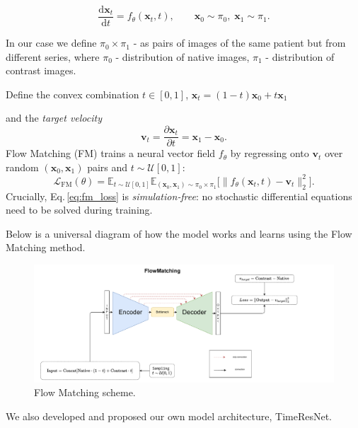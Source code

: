 \documentclass{article}
\begin{document}
\begin{equation}
\frac{\mathrm{d}\mathbf{x}_{t}}{\mathrm{d}t}=f_{\theta}(\mathbf{x}_{t},t),
\qquad
\mathbf{x}_{0}\sim\pi_{0},\;
\mathbf{x}_{1}\sim\pi_{1}.
\label{eq:flow_ode}
\end{equation}

In our case we define $\pi_{0}\!\times\!\pi_{1}$ - as pairs of images of the same patient but from different series, where $\pi_{0}$ - distribution of native images, $\pi_{1}$ - distribution of contrast images.

Define the convex combination $t \in [0, 1]$, $\mathbf{x}_{t}=(1-t)\mathbf{x}_{0}+t\mathbf{x}_{1}$ \label{eq:linear_combination}

and the
\emph{target velocity}
%
\begin{equation}
\mathbf{v}_t
      =\frac{\partial\mathbf{x}_{t}}{\partial t}
      =\mathbf{x}_{1}-\mathbf{x}_{0}.
\label{eq:target_vel}
\end{equation}
%
Flow Matching (FM) trains a neural vector field
$f_{\theta}$ by regressing onto $\mathbf{v}_{t}$
over random $(\mathbf{x}_{0},\mathbf{x}_{1})$ pairs and
$t\!\sim\!\mathcal{U}[0,1]$:
%
\begin{equation}
\mathcal{L}_{\mathrm{FM}}(\theta)=
\mathbb{E}_{t \sim \mathcal{U}[0,1]}\mathbb{E}_{(\mathbf{x}_{0},\mathbf{x}_{1}) \sim \pi_{0} \times \pi_{1}}
\bigl[
\lVert f_{\theta}(\mathbf{x}_{t},t)-
       \mathbf{v}_{t}\rVert_{2}^{2}
\bigr].
\label{eq:fm_loss}
\end{equation}
%
Crucially, Eq.\,\eqref{eq:fm_loss} is \emph{simulation‑free}: no stochastic differential equations need to be solved during training.

Below is a universal diagram of how the model works and learns using the Flow Matching method.

\begin{figure}[h!]
  \centering
  \includegraphics[width=0.7\linewidth]{images/flow.pdf}
  \caption{Flow Matching scheme.}
\end{figure}

We also developed and proposed our own model architecture, TimeResNet.
\end{document}
